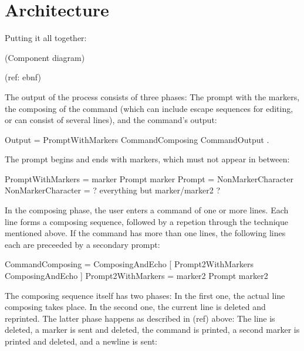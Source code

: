 \documentclass[paper=a4,twoside,abstract=on,cleardoublepage=empty,numbers=noenddot,toc=bib,12pt,appendixprefix=true]{scrreprt}
\begin{document}
%
%

\section{Architecture}

Putting it all together:

(Component diagram)

(ref: ebnf)


The output of the process consists of three phases: The prompt with the markers, the composing of the command (which can include escape sequences for editing, or can consist of several lines), and the command's output:

\begin{ebnf}
Output = { PromptWithMarkers CommandComposing CommandOutput } .
\end{ebnf}
%
The prompt begins and ends with markers, which must not appear in between:

\begin{ebnf}
PromptWithMarkers = marker Prompt marker
Prompt = { NonMarkerCharacter }
NonMarkerCharacter = ? everything but marker/marker2 ?
\end{ebnf}
%
In the composing phase, the user enters a command of one or more lines. Each line forms a composing sequence, followed by a repetion through the technique mentioned above. If the command has more than one lines, the following lines each are preceeded by a secondary prompt:

\begin{ebnf}
CommandComposing = ComposingAndEcho [ { Prompt2WithMarkers ComposingAndEcho } ]
Prompt2WithMarkers = marker2 Prompt marker2
\end{ebnf}
%
The composing sequence itself has two phases: In the first one, the actual line composing takes place. In the second one, the current line is deleted and reprinted. The latter phase happens as described in (ref) above: The line is deleted, a marker is sent and deleted, the command is printed, a second marker is printed and deleted, and a newline is sent:
\end{document}
